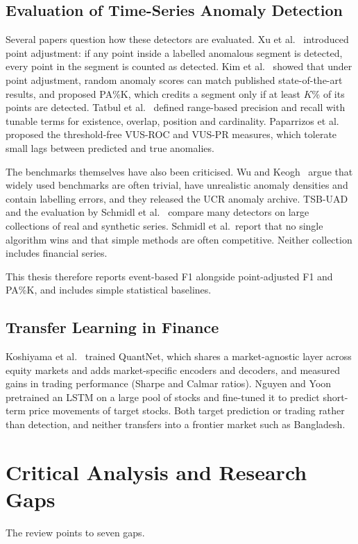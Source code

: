 \subsection{Evaluation of Time-Series Anomaly Detection}
Several papers question how these detectors are evaluated. Xu et
al.~\cite{xu2018unsupervised} introduced point adjustment: if any point inside a labelled
anomalous segment is detected, every point in the segment is counted as detected. Kim et
al.~\cite{kim2022towards} showed that under point adjustment, random anomaly scores can
match published state-of-the-art results, and proposed PA\%K, which credits a segment only
if at least $K$\% of its points are detected. Tatbul et al.~\cite{tatbul2018precision}
defined range-based precision and recall with tunable terms for existence, overlap,
position and cardinality. Paparrizos et al.~\cite{paparrizos2022volume} proposed the
threshold-free VUS-ROC and VUS-PR measures, which tolerate small lags between predicted and
true anomalies.

The benchmarks themselves have also been criticised. Wu and
Keogh~\cite{wu2023current} argue that widely used benchmarks are often trivial, have
unrealistic anomaly densities and contain labelling errors, and they released the UCR
anomaly archive. TSB-UAD~\cite{paparrizos2022tsb} and the evaluation by Schmidl et
al.~\cite{schmidl2022anomaly} compare many detectors on large collections of real and
synthetic series. Schmidl et al.\ report that no single algorithm wins and that simple
methods are often competitive. Neither collection includes financial series.

This thesis therefore reports event-based F1 alongside point-adjusted F1 and PA\%K, and
includes simple statistical baselines.

\subsection{Transfer Learning in Finance}
Koshiyama et al.~\cite{koshiyama2022quantnet} trained QuantNet, which shares a
market-agnostic layer across equity markets and adds market-specific encoders and decoders,
and measured gains in trading performance (Sharpe and Calmar ratios). Nguyen and
Yoon~\cite{nguyen2019novel} pretrained an LSTM on a large pool of stocks and fine-tuned it to
predict short-term price movements of target stocks. Both target prediction or trading
rather than detection, and neither transfers into a frontier market such as Bangladesh.

\section{Critical Analysis and Research Gaps}\label{sec:lr-gaps}
The review points to seven gaps.

